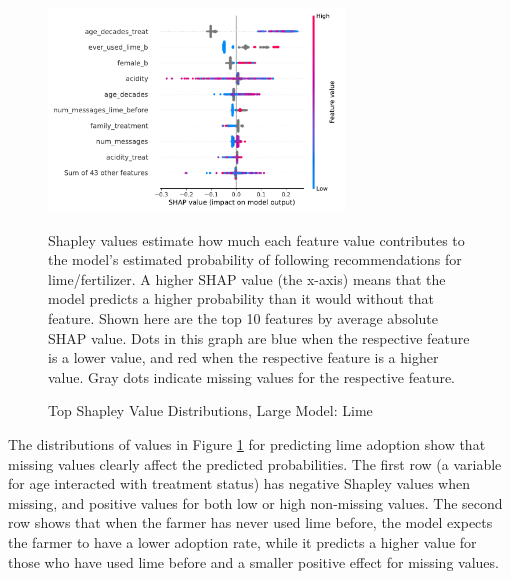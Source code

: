 \documentclass[12pt]{article}
\begin{document}
\begin{figure}[H]
    \centering
    \caption{Top Shapley Value Distributions, Large Model: Lime}
    \includegraphics[width=0.7\textwidth]{../output/shap_beeswarm_lime.pdf}
    \begin{minipage}{0.7\textwidth}
    \tiny
    Shapley values estimate how much each feature value contributes to the model's estimated probability of following recommendations for lime/fertilizer. A higher SHAP value (the x-axis) means that the model predicts a higher probability than it would without that feature. Shown here are the top 10 features by average absolute SHAP value. Dots in this graph are blue when the respective feature is a lower value, and red when the respective feature is a higher value. Gray dots indicate missing values for the respective feature.
    \end{minipage}
    \label{fig:shap_lime}
\end{figure}

The distributions of values in Figure \ref{fig:shap_lime} for predicting lime adoption show that missing values clearly affect the predicted probabilities. The first row (a variable for age interacted with treatment status) has negative Shapley values when missing, and positive values for both low or high non-missing values. The second row shows that when the farmer has never used lime before, the model expects the farmer to have a lower adoption rate, while it predicts a higher value for those who have used lime before and a smaller positive effect for missing values.
\end{document}
